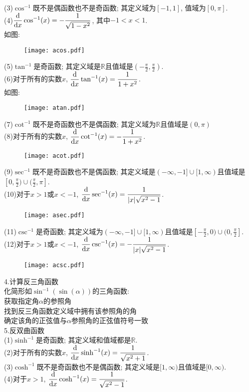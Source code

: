 (3)$\cos^{-1}$既不是偶函数也不是奇函数; 其定义域为$[-1,1]$, 值域为$[0,\pi]$.\\[1ex]
(4)$\displaystyle\frac{\mathop{}\!\mathrm{d} }{\mathop{}\!\mathrm{d} x}\cos^{-1}(x)=-\frac{1}{\sqrt{1-x^2}}$, 其中$-1<x<1$.\\[1ex]
如图:
\begin{figure}[H]
\centering
	\texttt{[image: acos.pdf]}
\end{figure}
(5)$\tan^{-1}$是奇函数; 其定义域是$\mathbb{R}$且值域是$\displaystyle(-\frac{\pi}{2},\frac{\pi}{2})$.\\[1ex]
(6)对于所有的实数$x$, $\displaystyle\frac{\mathop{}\!\mathrm{d} }{\mathop{}\!\mathrm{d} x}\tan^{-1}(x)=\frac{1}{1+x^2}$.\\[1ex]
如图:
\begin{figure}[H]
\centering
	\texttt{[image: atan.pdf]}
\end{figure}
(7)$\cot^{-1}$既不是奇函数也不是偶函数; 其定义域为$\mathbb{R}$且值域是$(0,\pi)$\\[1ex]
(8)对于所有的实数$x$, $\displaystyle\frac{\mathop{}\!\mathrm{d} }{\mathop{}\!\mathrm{d} x}\cot^{-1}(x)=-\frac{1}{1+x^2}$.\\[1ex]
\begin{figure}[H]
\centering
	\texttt{[image: acot.pdf]}
\end{figure}
(9)$\sec^{-1}$既不是奇函数也不是偶函数; 其定义域是$(-\infty,-1]\cup[1,\infty)$且值域是$\displaystyle[0,\frac{\pi}{2})\cup(\frac{\pi}{2},\pi]$.\\[1ex]
(10)对于$x>1$或$x<-1$, $\displaystyle\frac{\mathop{}\!\mathrm{d} }{\mathop{}\!\mathrm{d} x}\sec^{-1}(x)=\frac{1}{|x|\sqrt{x^2-1}}$.\\[1ex]
\begin{figure}[H]
\centering
	\texttt{[image: asec.pdf]}
\end{figure}

(11)$\csc^{-1}$是奇函数; 其定义域为$(-\infty,-1]\cup[1,\infty)$且值域是$\displaystyle[-\frac{\pi}{2},0)\cup(0,\frac{\pi}{2}]$.\\[1ex]
(12)对于$x>1$或$x<-1$, $\displaystyle\frac{\mathop{}\!\mathrm{d} }{\mathop{}\!\mathrm{d} x}\csc^{-1}(x)=-\frac{1}{|x|\sqrt{x^2-1}}$.\\[2ex]
\begin{figure}[H]
\centering
	\texttt{[image: acsc.pdf]}
\end{figure}\vspace{2ex}

4.计算反三角函数\\
化简形如$\sin^{-1}(\sin(\alpha))$的三角函数:\\
\phantom{(1)}获取指定角$\alpha$的参照角\\
\phantom{(1)}找到反三角函数定义域中拥有该参照角的角\\
\phantom{(1)}确定该角的正弦值与$\alpha$参照角的正弦值符号一致\\[2ex]

5.反双曲函数\\
(1)$\sinh^{-1}$是奇函数; 其定义域和值域都是$\mathbb{R}$.\\[1ex]
(2)对于所有的实数$x$, $\displaystyle\frac{\mathop{}\!\mathrm{d} }{\mathop{}\!\mathrm{d} x}\sinh^{-1}(x)=\frac{1}{\sqrt{x^2+1}}$.\\[1ex]
(3)$\cosh^{-1}$既不是奇函数也不是偶函数; 其定义域是$[1,\infty)$且值域是$[0,\infty)$.\\[1ex]
(4)对于$x>1$, $\displaystyle\frac{\mathop{}\!\mathrm{d} }{\mathop{}\!\mathrm{d} x}\cosh^{-1}(x)=\frac{1}{\sqrt{x^2-1}}$.\\[1ex]
